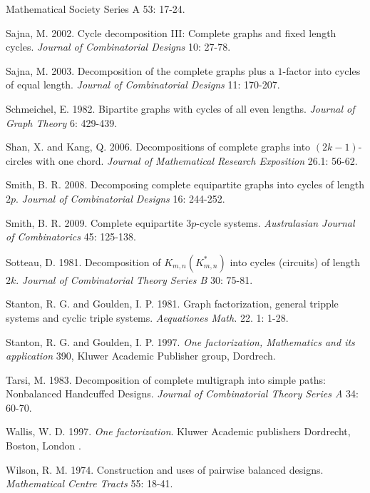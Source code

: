 \documentclass[12pt]{report}
\begin{document}
\begin{newpage}
\begin{description}
{Mathematical Society Series A} 53: 17-24.
\item Sajna, M. 2002. Cycle decomposition III: Complete graphs and fixed
length cycles. {\it Journal of Combinatorial Designs } 10: 27-78.
\item Sajna, M. 2003. Decomposition of the complete graphs plus a
$1$-factor into cycles of equal length. {\it Journal of Combinatorial
Designs} 11: 170-207.
\item Schmeichel, E. 1982. Bipartite graphs with cycles of all even
lengths. {\it Journal of Graph Theory }6: 429-439.
\item Shan, X. and Kang, Q. 2006. Decompositions of complete graphs into
$(2k-1)$-circles with one chord. {\it Journal of Mathematical Research Exposition}
26.1:  56-62.
\item Smith, B. R. 2008. Decomposing complete equipartite graphs into
cycles of length $2p$. {\it Journal of Combinatorial Designs} 16: 244-252.
\item Smith, B. R. 2009. Complete equipartite $3p$-cycle systems. {\it
Australasian
Journal of Combinatorics} 45: 125-138.
\item Sotteau, D. 1981. Decomposition of $K_{m,n}(K_{m,n}^*)$ into cycles
(circuits) of length $2k$. {\it Journal of Combinatorial Theory Series B} 30:
75-81.
\item Stanton, R. G. and Goulden, I. P. 1981. Graph factorization, general
tripple systems and cyclic triple systems. {\it Aequationes
Math.} 22. 1: 1-28.
\item Stanton, R. G. and Goulden, I. P. 1997.  {\it One factorization, Mathematics and its application} 390, Kluwer Academic Publisher group, Dordrech.
\item Tarsi, M. 1983. Decomposition of complete multigraph into
simple paths: Nonbalanced Handcuffed Designs. {\it Journal of Combinatorial Theory Series A} 34: 60-70.
\item Wallis, W. D. 1997. {\it One factorization}. Kluwer Academic
publishers Dordrecht, Boston, London .
\item Wilson, R. M. 1974. Construction and uses of pairwise balanced
designs. {\it Mathematical Centre Tracts } 55: 18-41.


\end{description}


\end{newpage}
\end{document}
